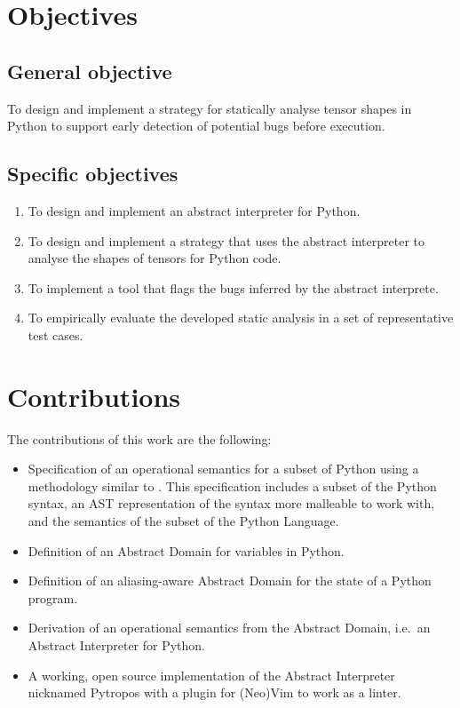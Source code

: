 \section{Objectives}\label{objectives}

\subsection{General objective}\label{general-objective}

To design and implement a strategy for statically analyse tensor shapes
in Python to support early detection of potential bugs before execution.

\subsection{Specific objectives}\label{specific-objectives}

\begin{enumerate}
\def\labelenumi{\arabic{enumi}.}
\tightlist
\item
  To design and implement an abstract interpreter for Python.
\item
  To design and implement a strategy that uses the abstract interpreter
  to analyse the shapes of tensors for Python code.
\item
  To implement a tool that flags the bugs inferred by the abstract
  interprete.
\item
  To empirically evaluate the developed static analysis in a set of
  representative test cases.
\end{enumerate}

\section{Contributions}\label{contributions}

The contributions of this work are the following:

\begin{itemize}
\tightlist
\item Specification of an operational semantics for a subset of Python using a methodology
  similar to \autocite{fromherz_static_2018}. This specification includes a subset of the
  Python syntax, an AST representation of the syntax more malleable to work with, and the
  semantics of the subset of the Python Language.
\item Definition of an Abstract Domain for variables in Python.
\item Definition of an aliasing-aware Abstract Domain for the state of a Python program.
\item Derivation of an operational semantics from the Abstract Domain, i.e.~an Abstract
  Interpreter for Python.
\item A working, open source implementation of the Abstract Interpreter nicknamed Pytropos
  with a plugin for (Neo)Vim to work as a linter.
\end{itemize}

